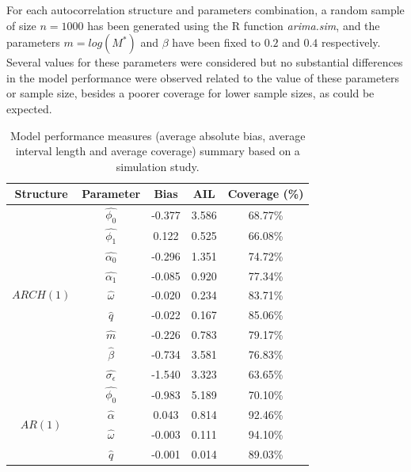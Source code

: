 \documentclass{article}
\begin{document}
For each autocorrelation structure and parameters combination, a random sample of size $n = 1000$ has been generated using the R function \textit{arima.sim}, and the parameters $m=log(M^*)$ and $\beta$ have been fixed to $0.2$ and $0.4$ respectively. Several values for these parameters were considered but no substantial differences in the model performance were observed related to the value of these parameters or sample size, besides a poorer coverage for lower sample sizes, as could be expected.

\begin{table}[h]
\tiny\sf\centering
\caption{Model performance measures (average absolute bias, average interval length and average coverage) summary based on a simulation study.\label{tab:estim_sim}}
\begin{tabular}{ccccc}
\toprule
Structure & Parameter & Bias & AIL & Coverage (\%)\\
\midrule
\multirow{9}{*}{$ARCH(1)$}    & $\hat{\phi_0}$            &-0.377 & 3.586 & 68.77\% \\
                              & $\hat{\phi_1}$            & 0.122 & 0.525 & 66.08\% \\
                              & $\hat{\alpha_0}$          &-0.296 & 1.351 & 74.72\% \\
                              & $\hat{\alpha_1}$          &-0.085 & 0.920 & 77.34\% \\
                              & $\hat{\omega}$            &-0.020 & 0.234 & 83.71\% \\
                              & $\hat{q}$                 &-0.022 & 0.167 & 85.06\% \\
                              & $\hat{m}$                 &-0.226 & 0.783 & 79.17\% \\
                              & $\hat{\beta}$             &-0.734 & 3.581 & 76.83\% \\
                              & $\hat{\sigma_{\epsilon}}$ &-1.540 & 3.323 & 63.65\% \\
\hline
\multirow{7}{*}{$AR(1)$}      & $\hat{\phi_0}$            &-0.983 & 5.189 & 70.10\% \\
                              & $\hat{\alpha}$            & 0.043 & 0.814 & 92.46\% \\
                              & $\hat{\omega}$            &-0.003 & 0.111 & 94.10\% \\
                              & $\hat{q}$                 &-0.001 & 0.014 & 89.03\% \\

\end{tabular}
\end{table}
\end{document}
